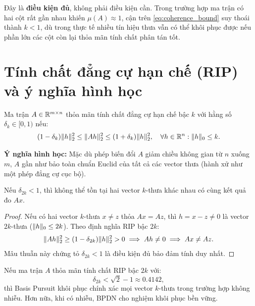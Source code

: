 \begin{remark}
Đây là \textbf{điều kiện đủ}, không phải điều kiện cần. Trong trường hợp ma trận có hai cột rất gần nhau khiến $\mu(A) \approx 1$, cận trên \eqref{eq:coherence_bound} suy thoái thành $k < 1$, dù trong thực tế nhiều tín hiệu thưa vẫn có thể khôi phục được nếu phần lớn các cột còn lại thỏa mãn tính chất phân tán tốt.
\end{remark}

\section{Tính chất đẳng cự hạn chế (RIP) và ý nghĩa hình học}
\begin{definition}
Ma trận $A \in \mathbb{R}^{m \times n}$ thỏa mãn tính chất đẳng cự hạn chế bậc $k$ với hằng số $\delta_k \in [0, 1)$ nếu:
\begin{equation}
    (1 - \delta_k) \|h\|_2^2 \le \|Ah\|_2^2 \le (1 + \delta_k) \|h\|_2^2, \quad \forall h \in \mathbb{R}^n : \|h\|_0 \le k.
\end{equation}
\end{definition}

\textbf{Ý nghĩa hình học:} Mặc dù phép biến đổi $A$ giảm chiều không gian từ $n$ xuống $m$, $A$ gần như bảo toàn chuẩn Euclid của tất cả các vector thưa (hành xử như một phép đẳng cự cục bộ).

\begin{theorem}
Nếu $\delta_{2k} < 1$, thì không thể tồn tại hai vector $k$-thưa khác nhau có cùng kết quả đo $Ax$.
\end{theorem}

\begin{proof}
Nếu có hai vector $k$-thưa $x \ne z$ thỏa $Ax = Az$, thì $h = x - z \ne 0$ là vector $2k$-thưa ($\|h\|_0 \le 2k$). Theo định nghĩa RIP bậc $2k$:
\[
\|Ah\|_2^2 \ge (1 - \delta_{2k}) \|h\|_2^2 > 0 \implies Ah \ne 0 \implies Ax \ne Az.
\]
Mâu thuẫn này chứng tỏ $\delta_{2k} < 1$ là điều kiện đủ bảo đảm tính duy nhất.
\end{proof}

\begin{theorem}
Nếu ma trận $A$ thỏa mãn tính chất RIP bậc $2k$ với:
\begin{equation}
    \delta_{2k} < \sqrt{2} - 1 \approx 0.4142,
\end{equation}
thì Basis Pursuit khôi phục chính xác mọi vector $k$-thưa trong trường hợp không nhiễu. Hơn nữa, khi có nhiễu, BPDN cho nghiệm khôi phục bền vững.
\end{theorem}

